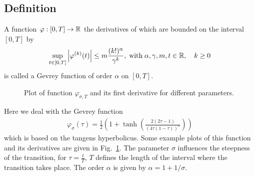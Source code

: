 \documentclass[a4paper,11pt,headings=standardclasses,parskip=half]{scrartcl}
\begin{document}
\begin{appendices}
\subsection{Definition}
A function $\varphi:[0, T] \rightarrow \mathbb{R}$ the derivatives of which are bounded on the interval $[0,T]$  by
\begin{equation}\label{eq:gevrey:limit}
  \sup_{t \in [0,T]} \left| \varphi^{(k)}(t) \right| \leq m
  \frac{(k!)^{\alpha}}{\gamma^k}, \; \mbox{with} \;
  \alpha,\gamma,m,t   \in \mathbb{R}, \quad k \geq 0
\end{equation}
is called a Gevrey function of order $\alpha$ on $[0, T]$.
\begin{figure}[ht]
  \begin{center}
    \caption{Plot of function $\varphi_{\sigma,T}$  and its first derivative for different parameters.}
    \label{fig:gevrey}
  \end{center}
\end{figure}
Here we deal with the Gevrey function
\begin{align}
\varphi_\sigma\left(\tau\right) = \frac{1}{2}\left(1 + \tanh \left( \frac{2(2\tau-1)}{(4\tau(1-\tau))^\sigma}\right)\right)
\end{align}
which is based on the tangens hyperbolicus. Some example plots of this function and its derivatives are given in
Fig.\ \ref{fig:gevrey}. The parameter $\sigma$ influences the steepness of the transition, for $\tau=\frac{t}{T}$, $T$ defines the length
of the interval where the transition takes place. The order  $\alpha$ is given by $\alpha=1+1/\sigma$.


\end{appendices}
\end{document}
